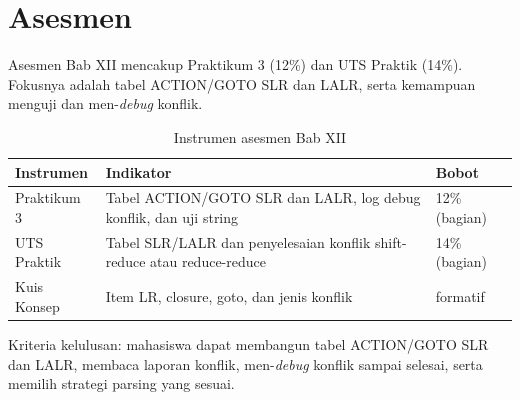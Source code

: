 \section*{Asesmen}

Asesmen Bab XII mencakup Praktikum 3 (12\%) dan UTS Praktik (14\%).
Fokusnya adalah tabel ACTION/GOTO SLR dan LALR, serta kemampuan
menguji dan men-\textit{debug} konflik.

\begin{table}[H]
\centering
\caption{Instrumen asesmen Bab XII}
\label{tab:ch12-asesmen}
\begin{tabularx}{\textwidth}{@{}lXl@{}}
\toprule
\textbf{Instrumen} & \textbf{Indikator} & \textbf{Bobot} \\
\midrule
Praktikum 3 & Tabel ACTION/GOTO SLR dan LALR, log debug konflik, dan
uji string & 12\% (bagian) \\
UTS Praktik & Tabel SLR/LALR dan penyelesaian konflik shift-reduce
atau reduce-reduce & 14\% (bagian) \\
Kuis Konsep & Item LR, closure, goto, dan jenis konflik & formatif \\
\bottomrule
\end{tabularx}
\end{table}

Kriteria kelulusan: mahasiswa dapat membangun tabel ACTION/GOTO SLR
dan LALR, membaca laporan konflik, men-\textit{debug} konflik sampai
selesai, serta memilih strategi parsing yang sesuai.
